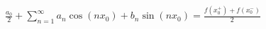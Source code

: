 \documentclass[preview]{standalone}
\begin{document}
\begin{center}
$\displaystyle{\frac{a_0}{2}+\sum\limits_{n=1}^{\infty}a_n\cos{(nx_0)}+b_n\sin{(nx_0)}=\frac{f(x_0^+)+f(x_0^-)}{2}}$
\end{center}
\end{document}
